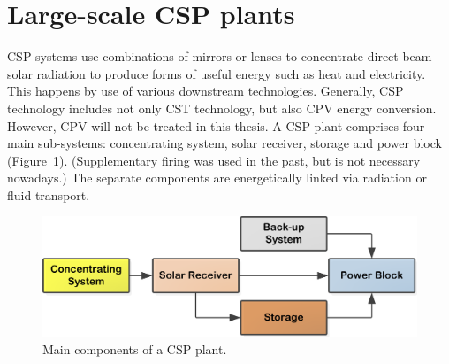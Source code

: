 \section{Large-scale CSP plants}\label{Large scale concentrated solar power (CSP) plants}
\ac{CSP} systems use combinations of mirrors or lenses to concentrate direct beam solar radiation to produce forms of useful energy such as heat and electricity. This happens by use of various downstream technologies. Generally, \ac{CSP} technology includes not only \ac{CST} technology, but also \ac{CPV} energy conversion. However, \ac{CPV} will not be treated in this thesis.
A \ac{CSP} plant comprises four main sub-systems: concentrating system, solar receiver, storage and power block (Figure~\ref{MainComp}). (Supplementary firing was used in the past, but is not necessary nowadays.) The separate components are energetically linked via radiation or fluid transport.
\begin{figure}[!h] 
\centering
\includegraphics[width=0.85\linewidth]{FIG/MainComp}
\caption[Main components of a CSP plant.]{Main components of a CSP plant.}\label{MainComp}
\end{figure}

